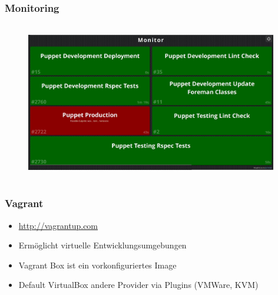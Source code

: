 \documentclass{beamer}
\begin{document}
\begin{frame}
  \frametitle{Monitoring}
  \begin{figure}[ht]
    \centering
      \includegraphics[height=7cm,width=11cm]{../pics/jenkins_monitor.png}
    \label{fig:stack}
  \end{figure}
\end{frame}

\begin{frame}
\end{frame}


\begin{frame}
  \frametitle{Vagrant}

  \begin{itemize}
  \item \url{http://vagrantup.com}
  \item Ermöglicht virtuelle Entwicklungsumgebungen
  \item Vagrant Box ist ein vorkonfiguriertes Image
  \item Default VirtualBox andere Provider via Plugins (VMWare, KVM)
  \end{itemize}
\end{frame}

\begin{frame}
\end{frame}

\begin{frame}
\end{frame}
\end{document}
